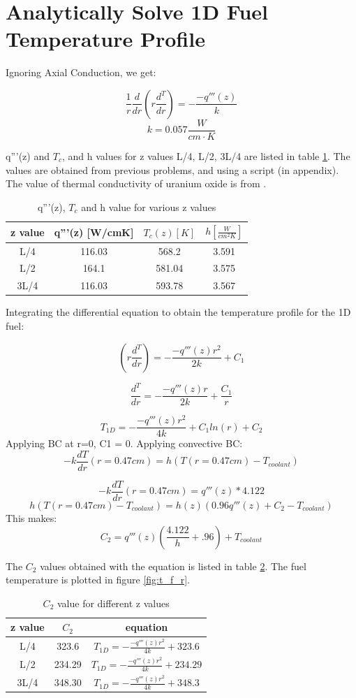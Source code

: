 \documentclass[12pt,letterpaper]{article}
\begin{document}
\section*{Analytically Solve 1D Fuel Temperature Profile}
Ignoring Axial Conduction, we get:

\[\frac{1}{r} \frac{d}{dr} (r \frac{d^T}{dr}) = -\frac{-q'''(z)}{k}\]
\[k = 0.057 \frac{W}{cm\cdot K}\]

q'''(z) and $T_c$, and h  values for z values L/4, L/2, 3L/4 are listed in table \ref{tab:q_vol}.
The values are obtained from previous problems, and using a script (in appendix).
The value of thermal conductivity of uranium oxide is from \cite{ronchi_thermal_1999}.

\begin{table}[h]
     \centering
    \begin{tabular}{cccc}
       \hline
       z value & q'''(z) [W/cmK] & $T_c(z) [K]$ & $h [\frac{W}{cm^2 K}] $ \\
       \hline
       L/4 & 116.03 & 568.2 & 3.591 \\
       L/2 & 164.1 & 581.04 & 3.575 \\
       3L/4 & 116.03 & 593.78 & 3.567 \\
       \hline
    \end{tabular}
    \caption {q'''(z), $T_c$ and h value for various z values}
    \label{tab:q_vol}
\end{table}

Integrating the differential equation to obtain the temperature profile for the
1D fuel:


\[ (r \frac{d^T}{dr}) = -\frac{-q'''(z)r^2}{2k} + C_1 \]

\[ \frac{d^T}{dr} = -\frac{-q'''(z)r}{2k} + \frac{C_1}{r} \]

\[ T_{1D} = -\frac{-q'''(z)r^2}{4k} + C_1 ln(r) + C_2 \]
Applying BC at r=0, C1 = 0.
Applying convective BC:
\[ -k \frac{dT}{dr}(r= 0.47 cm) = h (T(r = 0.47 cm ) - T_{coolant})\]

\[-k \frac{dT}{dr}(r = 0.47 cm) = q'''(z) * 4.122\]
\[h (T(r = 0.47 cm ) - T_{coolant}) = h(z) (0.96 q'''(z)  + C_2 - T_{coolant}) \]
This makes:
\[C_2 = q'''(z) (\frac{4.122}{h} +.96) + T_{coolant}\]

The $C_2$ values obtained with the equation is listed in table \ref{tab:c2}.
The fuel temperature is plotted in figure \ref{fig:t_f_r}.

\begin{table}[h]
     \centering
    \begin{tabular}{ccc}
       \hline
       z value & $C_2$ & equation \\
       \hline
       L/4 & 323.6  & $T_{1D} = -\frac{-q'''(z)r^2}{4k} + 323.6$ \\
       L/2 & 234.29 & $T_{1D} = -\frac{-q'''(z)r^2}{4k} + 234.29$ \\
       3L/4 & 348.30 & $T_{1D} = -\frac{-q'''(z)r^2}{4k} + 348.3$\\
       \hline
    \end{tabular}
    \caption {$C_2$ value for different z values}
    \label{tab:c2}
\end{table}
\end{document}

